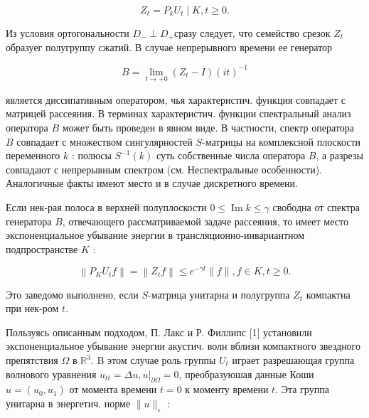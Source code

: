 \documentclass[10pt]{article}
\begin{document}
\[

Z_{t}=P_{k} U_{t} \mid K, t \geqslant 0 .

\]



Из условия ортогональности $D_{-} \perp D_{+}$сразу следует, что семейство срезок $Z_{t}$ образуег полугруппу сжатий. В случае непрерывного времени ее генератор



\[

B=\lim _{t \rightarrow+0}\left(Z_{t}-I\right)(i t)^{-1}

\]



является диссипативным оператором, чья характеристич. функция совпадает с матрицей рассеяния. В терминах характеристич. функции спектральный анализ оператора $B$ может быть проведен в явном виде. В частности, спектр оператора $B$ совпадает с множеством сингулярностей $S$-матрицы на комплексной плоскости переменного $k$ : полюсы $S^{-1}(k)$ суть собственные числа оператора $B$, а разрезы совпадают с непрерывным спектром (см. Неспектральные особенности). Аналогичные факты имеют место и в случае дискретного времени.



Если нек-рая полоса в верхней полуплоскости $0 \leqslant \operatorname{Im} k \leqslant \gamma$ свободна от спектра генератора $B$, отвечающего рассматриваемой задаче рассеяния, то имеет место экспоненциальное убывание энергии в трансляционно-инвариантном подпространстве $K$ :



\[

\left\|P_{K} U_{t} f\right\|=\left\|Z_{t} f\right\| \leqslant e^{-\gamma t}\|f\|, f \in K, t \geqslant 0 .

\]



Это заведомо выполнено, если $S$-матрица унитарна и полугруппа $Z_{t}$ компактна при нек-ром $t$.



Пользуясь описанным подходом, П. Лакс и Р. Филлипс [1] установили экспоненциальное убывание энергии акустич. волн вблизи компактного звездного препятствия $\Omega$ в $\mathbb{R}^{3}$. B этом случае роль группы $U_{t}$ играет разрешающая группа волнового уравнения $u_{t t}=\Delta u,\left.u\right|_{\partial \Omega}=0$, преобразуюшая данные Коши $u=\left(u_{0}, u_{1}\right)$ от момента времени $t=0$ к моменту времени $t$. Эта группа унитарна в энергетич. норме $\|u\|_{\varepsilon}$ :
\end{document}
